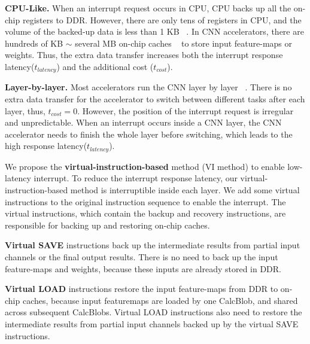 \textbf{CPU-Like.}
When an interrupt request occurs in CPU, CPU backs up all the on-chip registers to DDR. However, there are only tens of registers in CPU, and the volume of the backed-up data is less than 1 KB  ~\cite{furber2000arm}. In CNN accelerators, there are hundreds of KB $\sim$ several MB on-chip caches  ~\cite{qiu2016going, guo2017angel} to store input feature-maps or weights. 
Thus, the extra data transfer increases both the interrupt response latency($t_{latency}$) and the additional cost ($t_{cost}$).

\textbf{Layer-by-layer.}
Most accelerators run the CNN layer by layer  ~\cite{qiu2016going,guo2017angel}. 
There is no extra data transfer for the accelerator to switch between different tasks after each layer, thus, $t_{cost}=0$. 
However, the position of the interrupt request is irregular and unpredictable. When an interrupt occurs inside a CNN layer, the CNN accelerator needs to finish the whole layer before switching, which leads to the high response latency($t_{latency}$).




We propose the \textbf{virtual-instruction-based} method (VI method) to enable low-latency interrupt. 
To reduce the interrupt response latency, our virtual-instruction-based method is interruptible inside each layer. We add some virtual instructions to the original instruction sequence to enable the interrupt.
The virtual instructions, which contain the backup and recovery instructions, are responsible for backing up and restoring on-chip caches. 

\textbf{Virtual SAVE} instructions back up the intermediate results from partial input channels or the final output results. There is no need to back up the input feature-maps and weights, because these inputs are already stored in DDR. 

\textbf{Virtual LOAD} instructions restore the input feature-maps from DDR to on-chip caches, because input featuremaps are loaded by one CalcBlob, and shared across subsequent CalcBlobs.
Virtual LOAD instructions also need to restore the intermediate results from partial input channels backed up by the virtual SAVE instructions.

